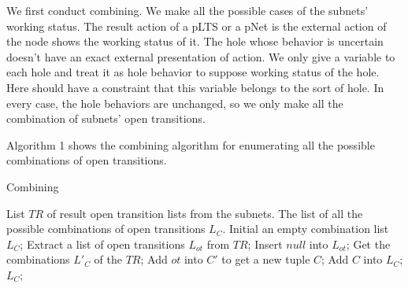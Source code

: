 \documentclass{lncs/llncs}
\begin{document}
We first conduct combining. We make all the possible cases of the subnets' working status. The result action of a pLTS or a pNet is the external action of the node shows the working status of it. The hole whose behavior is uncertain doesn't have an exact external presentation of action. We only give a variable to each hole and treat it as hole behavior to suppose working status of the hole. Here should have a constraint that this variable belongs to the sort of hole. In every case, the hole behaviors are unchanged, so we only make all the combination of subnets' open transitions.

Algorithm 1 shows the combining algorithm for enumerating all the possible combinations of open transitions. 
\begin{algorithm}
\caption{Combining}
\begin{algorithmic}[1]

\Require List $TR$ of result open transition lists from the subnets. 
\Ensure The list of all the possible combinations of open transitions $L_C$.
\State Initial an empty combination list $L_C$;
\State Extract a list of open transitions $L_{ot}$ from $TR$;
\State Insert $null$ into $L_{ot}$;
\State Get the combinations $L'_C$ of the $TR$;
		\State Add $ot$ into $C'$ to get a new tuple $C$;
		\State Add $C$ into $L_C$;
	\EndFor
\EndFor 
\State \Return $L_C$;

\end{algorithmic}  
\end{algorithm}
\end{document}
